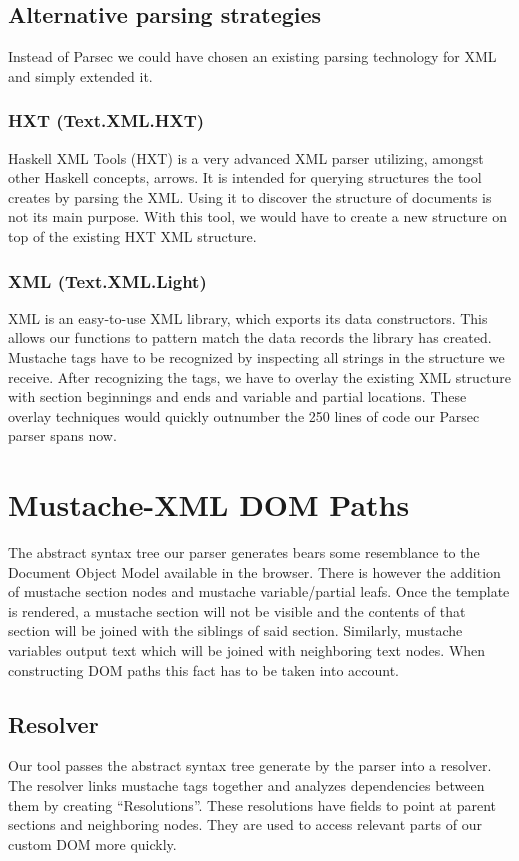 \documentclass[thesis.tex]{subfiles}
\begin{document}
\subsection{Alternative parsing strategies}
Instead of Parsec we could have chosen an existing parsing technology for XML
and simply extended it.

\subsubsection{HXT (Text.XML.HXT)}
Haskell XML Tools (HXT) is a very advanced XML parser utilizing, amongst other
Haskell concepts, arrows. It is intended for querying structures the
tool creates by parsing the XML. Using it to discover the structure
of documents is not its main purpose. With this tool, we would have to create a
new structure on top of the existing HXT XML structure.

\subsubsection{XML (Text.XML.Light)}
XML is an easy-to-use XML library, which exports its data constructors.
This allows our functions to pattern match the data records the library has
created.
Mustache tags have to be recognized by inspecting all strings in the
structure we receive. After recognizing the tags, we have to overlay the
existing XML structure with section beginnings and ends and variable and partial
locations.
These overlay techniques would quickly outnumber the 250 lines of code our
Parsec parser spans now.

\section{Mustache-XML DOM Paths}
\label{sec:paths}
The abstract syntax tree our parser generates bears some resemblance to the
Document Object Model available in the browser. There is however the addition of
mustache section nodes and mustache variable/partial leafs.
Once the template is rendered, a mustache section will not be visible and the
contents of that section will be joined with the siblings of said section.
Similarly, mustache variables output text which will be joined with neighboring
text nodes. When constructing DOM paths this fact has to be taken into account.

\subsection{Resolver}
\label{sec:resolver}
Our tool passes the abstract syntax tree generate by the parser into a resolver.
The resolver links mustache tags together and analyzes dependencies between
them by creating ``Resolutions''. These resolutions have fields to point at
parent sections and neighboring nodes. They are used to access relevant parts of
our custom DOM more quickly.
\end{document}
